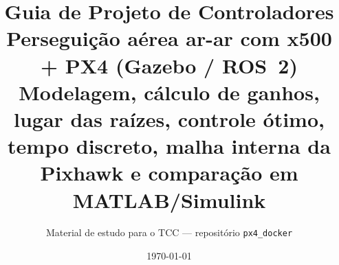 \documentclass[11pt,a4paper,oneside]{report}
\title{\textbf{Guia de Projeto de Controladores}\\[4pt]
  \large Perseguição aérea ar-ar com x500 + PX4 (Gazebo / ROS~2)\\[2pt]
  \normalsize Modelagem, cálculo de ganhos, lugar das raízes, controle ótimo,\\
  tempo discreto, malha interna da Pixhawk e comparação em MATLAB/Simulink}
\author{Material de estudo para o TCC --- repositório \texttt{px4\_docker}}
\date{\today}
\begin{document}
\maketitle
\tableofcontents



















\appendix


\nocite{*}


\end{document}
